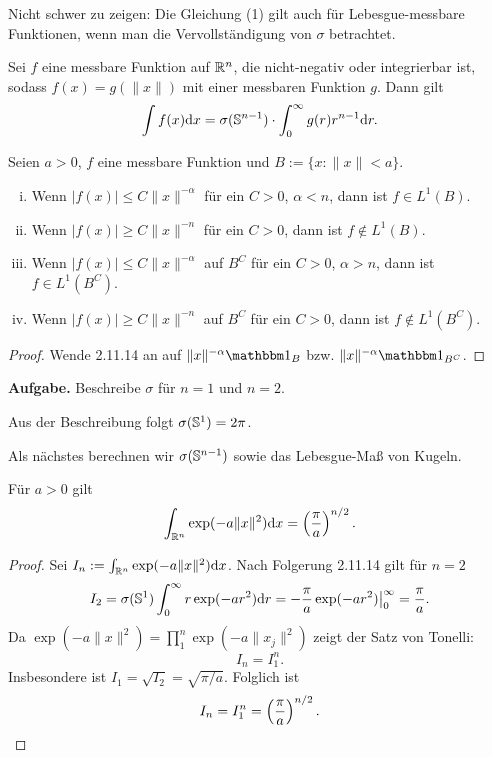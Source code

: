 \begin{rmrk}
  Nicht schwer zu zeigen: Die Gleichung (1) gilt auch für Lebesgue-messbare
  Funktionen, wenn man die Vervollständigung von $\sigma$ betrachtet.
\end{rmrk}

\begin{folg}
  Sei $f$ eine messbare Funktion auf $\mathbb{R}^n$, die nicht-negativ oder
  integrierbar ist, sodass $f(x) = g(\|x\|)$ mit einer messbaren Funktion $g$.
  Dann gilt
  \[ \int f(x) \mathrm{d} x = \sigma(\mathbb{S}^{n-1}) \cdot \int_0^\infty g(r)
    r^{n-1} \mathrm{d} r. \]
\end{folg}

\begin{folg}
  Seien $a > 0$, $f$ eine messbare Funktion und $B := \{ x : \|x\|<a\}$.
  \begin{enumerate}[(i)]
    \item Wenn $|f(x)| \le C \|x\|^{-\alpha}$ für ein $C > 0$, $\alpha < n$, dann
      ist $f \in L^1(B)$.
    \item Wenn $|f(x)| \ge C \|x\|^{-n}$ für ein $C > 0$, dann ist $f \notin
      L^1(B)$.
    \item Wenn $|f(x)| \le C \|x\|^{-\alpha}$ auf $B^C$ für ein $C > 0$, $\alpha
      > n$, dann ist $f \in L^1(B^C)$.
    \item Wenn $|f(x)| \ge C \|x\|^{-n}$ auf $B^C$ für ein $C > 0$, dann ist $f
      \notin L^1(B^C)$.
  \end{enumerate}
\end{folg}  

\begin{proof}
  Wende 2.11.14 an auf $\|x\|^{-\alpha} \ind_B$ bzw. $\|x\|^{-\alpha}
  \ind_{B^C}$.
\end{proof}

\begin{prgp}
  \textbf{Aufgabe.}
  Beschreibe $\sigma$ für $n=1$ und $n=2$.

  Aus der Beschreibung folgt $\sigma(\mathbb{S}^1) = 2 \pi$.
\end{prgp}

Als nächstes berechnen wir $\sigma(\mathbb{S}^{n-1})$ sowie das Lebesgue-Maß von
Kugeln.

\begin{lem}
  Für $a > 0$ gilt
  \[ \int_{\mathbb{R}^n} \exp(-a\|x\|^2) \mathrm{d} x = \left(  \frac{\pi}{a}
    \right)^{n/2}. \]
\end{lem}

\begin{proof}
  Sei $I_n := \int_{\mathbb{R}^n} \exp(-a\|x\|^2) \mathrm{d} x$. Nach Folgerung 2.11.14
  gilt für $n=2$
  \[ I_2 = \sigma(\mathbb{S}^1) \int_0^\infty r \exp(-ar^2) \mathrm{d} r = -
    \frac{\pi}{a} \exp(-ar^2) \big|_0^\infty  = \frac{\pi}{a}. \]
  Da $\exp(-a \|x\|^2) = \prod_1^n \exp(-a \|x_j\|^2)$ zeigt der Satz von
  Tonelli:
  \[ I_n = I_1^n. \]
  Insbesondere ist $I_1 = \sqrt{I_2} = \sqrt{\pi/a}$. Folglich ist
  \[ I_n = I_1^n = \left(  \frac{\pi}{a} \right)^{n/2}. \qedhere \]
\end{proof}

